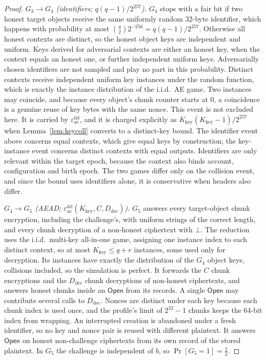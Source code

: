 \documentclass[pdflatex,sn-mathphys-num]{sn-jnl}%
\theoremstyle{plain}
\theoremstyle{definition}
\begin{document}
\begin{proof}
\emph{$G_3\to G_4$ (identifiers; $q(q-1)/2^{257}$).} $G_4$ stops with a fair bit if two honest target objects receive the same uniformly random 32-byte identifier, which happens with probability at most $\binom q2 2^{-256}=q(q-1)/2^{257}$. Otherwise all honest contexts are distinct, so the honest object keys are independent and uniform. Keys derived for adversarial contexts are either an honest key, when the context equals an honest one, or further independent uniform keys. Adversarially chosen identifiers are not sampled and play no part in this probability. Distinct contexts receive independent uniform key instances under the random function, which is exactly the instance distribution of the i.i.d.\ AE game. Two instances may coincide, and because every object's chunk counter starts at $0$, a coincidence is a genuine reuse of key bytes with the same nonce. This event is not excluded here. It is carried by $\varepsilon^{\mathrm{iid}}_{\mathrm{ae}}$, and it is charged explicitly as $K_{\mathrm{key}}(K_{\mathrm{key}}-1)/2^{257}$ when Lemma~\ref{lem:keycoll} converts to a distinct-key bound. The identifier event above concerns equal contexts, which give equal keys by construction; the key-instance event concerns distinct contexts with equal outputs. Identifiers are only relevant within the target epoch, because the context also binds account, configuration and birth epoch. The two games differ only on the collision event, and since the bound uses identifiers alone, it is conservative when headers also differ.

\emph{$G_4\to G_5$ (AEAD; $\varepsilon^{\mathrm{iid}}_{\mathrm{ae}}(K_{\mathrm{key}},C,D_{\mathrm{dec}})$).} $G_5$ answers every target-object chunk encryption, including the challenge's, with uniform strings of the correct length, and every chunk decryption of a non-honest ciphertext with $\bot$. The reduction uses the i.i.d.\ multi-key all-in-one game, assigning one instance index to each distinct context, so at most $K_{\mathrm{key}}\le q+r$ instances, some used only for decryption. Its instances have exactly the distribution of the $G_4$ object keys, collisions included, so the simulation is perfect. It forwards the $C$ chunk encryptions and the $D_{\mathrm{dec}}$ chunk decryptions of non-honest ciphertexts, and answers honest chunks inside an $\mathsf{Open}$ from its records. A single $\mathsf{Open}$ may contribute several calls to $D_{\mathrm{dec}}$. Nonces are distinct under each key because each chunk index is used once, and the profile's limit of $2^{32}-1$ chunks keeps the 64-bit index from wrapping. An interrupted creation is abandoned under a fresh identifier, so no key and nonce pair is reused with different plaintext. It answers $\mathsf{Open}$ on honest non-challenge ciphertexts from its own record of the stored plaintext. In $G_5$ the challenge is independent of $b$, so $\Pr[G_5=1]=\tfrac12$.


\end{proof}
\end{document}
